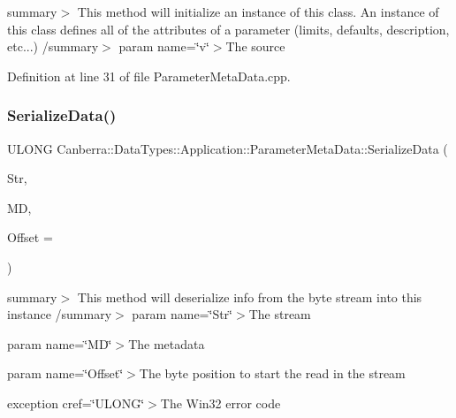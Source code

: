 summary$>$ This method will initialize an instance of this class. An instance of this class defines all of the attributes of a parameter (limits, defaults, description, etc...) /summary$>$ param name=\char`\"{}v\char`\"{}$>$The source

Definition at line 31 of file Parameter\+Meta\+Data.\+cpp.

\mbox{\label{class_canberra_1_1_data_types_1_1_application_1_1_parameter_meta_data_a372d2c553626789fed5999e1395363ed_a372d2c553626789fed5999e1395363ed}} 
\subsubsection{\texorpdfstring{Serialize\+Data()}{SerializeData()}}
{\footnotesize\ttfamily U\+L\+O\+NG Canberra\+::\+Data\+Types\+::\+Application\+::\+Parameter\+Meta\+Data\+::\+Serialize\+Data (\begin{DoxyParamCaption}\item[{\hyperlink{class_canberra_1_1_utility_1_1_core_1_1_byte_stream}{Canberra\+::\+Utility\+::\+Core\+::\+Byte\+Stream} \&}]{Str,  }\item[{const \hyperlink{class_canberra_1_1_serialization_1_1_meta_data}{Canberra\+::\+Serialization\+::\+Meta\+Data} \&}]{MD,  }\item[{const L\+O\+NG}]{Offset = {} }\end{DoxyParamCaption})\hspace{0.3cm}{\ttfamily [virtual]}}

summary$>$ This method will deserialize info from the byte stream into this instance /summary$>$ param name=\char`\"{}\+Str\char`\"{}$>$The stream

param name=\char`\"{}\+M\+D\char`\"{}$>$The metadata

param name=\char`\"{}\+Offset\char`\"{}$>$The byte position to start the read in the stream

exception cref=\char`\"{}\+U\+L\+O\+N\+G\char`\"{}$>$The Win32 error code

